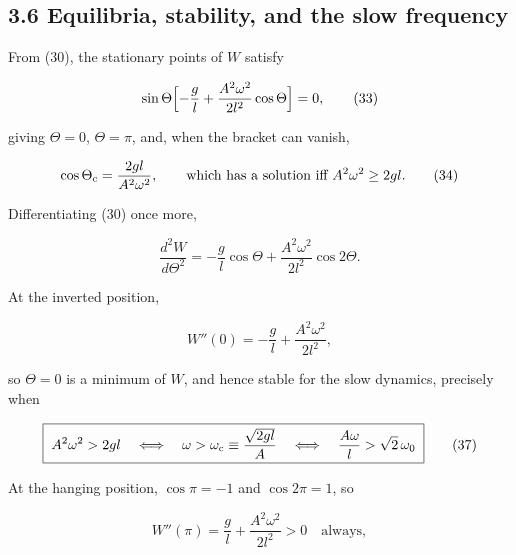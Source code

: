 \documentclass[11pt,a4paper]{article}
\begin{document}
\hypertarget{equilibria-stability-and-the-slow-frequency}{%
\subsection{3.6 Equilibria, stability, and the slow frequency}\label{equilibria-stability-and-the-slow-frequency}}

From (30), the stationary points of \(W\) satisfy

\begin{equation}
\sin\Theta\Bigl[-\frac{g}{l} + \frac{A^2\omega^2}{2l^2}\cos\Theta\Bigr]=0,
  \tag{33}
\end{equation}

giving \(\Theta=0\), \(\Theta=\pi\), and, when the bracket can vanish,

\begin{equation}
\cos\Theta_{\rm c} = \frac{2gl}{A^2\omega^2},
  \qquad\text{which has a solution iff } A^2\omega^2\ge 2gl. \tag{34}
\end{equation}

Differentiating (30) once more,

\begin{equation}
\frac{d^2W}{d\Theta^2}
 = -\frac{g}{l}\cos\Theta + \frac{A^2\omega^2}{2l^2}\cos2\Theta. \tag{35}
\end{equation}

At the inverted position,

\begin{equation}
W''(0) = -\frac{g}{l} + \frac{A^2\omega^2}{2l^2}, \tag{36}
\end{equation}

so \(\Theta=0\) is a minimum of \(W\), and hence stable for the slow dynamics,
precisely when

\begin{equation}
\boxed{\;A^2\omega^2 > 2gl
  \quad\Longleftrightarrow\quad
  \omega > \omega_{\rm c}\equiv\frac{\sqrt{2gl}}{A}
  \quad\Longleftrightarrow\quad
  \frac{A\omega}{l} > \sqrt{2}\,\omega_0 \;} \tag{37}
\end{equation}

At the hanging position, \(\cos\pi=-1\) and \(\cos2\pi=1\), so

\begin{equation}
W''(\pi) = \frac{g}{l} + \frac{A^2\omega^2}{2l^2} > 0 \quad\text{always},
  \tag{38}
\end{equation}
\end{document}
